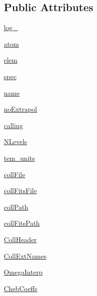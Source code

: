 \subsection*{Public Attributes}
\begin{DoxyCompactItemize}
\item 
\hyperlink{classpyneb_1_1core_1_1pynebcore_1_1___coll_data_fits_afd87151907f32bc0dc45f0171b61374e}{log\-\_\-}
\item 
\hyperlink{classpyneb_1_1core_1_1pynebcore_1_1___coll_data_fits_a0c5c7091b1d8a95d9bee2744d713f5c9}{atom}
\item 
\hyperlink{classpyneb_1_1core_1_1pynebcore_1_1___coll_data_fits_a62e73dc66c7aff7941c5ce94e808c23a}{elem}
\item 
\hyperlink{classpyneb_1_1core_1_1pynebcore_1_1___coll_data_fits_adaf1b66faf18504ec4b5c8c0b7f6763b}{spec}
\item 
\hyperlink{classpyneb_1_1core_1_1pynebcore_1_1___coll_data_fits_ab74e6bf80237ddc4109968cedc58c151}{name}
\item 
\hyperlink{classpyneb_1_1core_1_1pynebcore_1_1___coll_data_fits_a52e264b8c50ff2cf7d96c19e3f1e2a95}{no\-Extrapol}
\item 
\hyperlink{classpyneb_1_1core_1_1pynebcore_1_1___coll_data_fits_ab25fa7ebe84b603684dee62410c1e34c}{calling}
\item 
\hyperlink{classpyneb_1_1core_1_1pynebcore_1_1___coll_data_fits_a4d45fe163c2108853ab418386bf4da56}{N\-Levels}
\item 
\hyperlink{classpyneb_1_1core_1_1pynebcore_1_1___coll_data_fits_a538e48ab1f2ca63dbe55abea69ca2242}{tem\-\_\-units}
\item 
\hyperlink{classpyneb_1_1core_1_1pynebcore_1_1___coll_data_fits_ab1799c18dddda68ec8651caf93c90e40}{coll\-File}
\item 
\hyperlink{classpyneb_1_1core_1_1pynebcore_1_1___coll_data_fits_a1570b17843b0152b836049295bedb8ec}{coll\-Fits\-File}
\item 
\hyperlink{classpyneb_1_1core_1_1pynebcore_1_1___coll_data_fits_adde256ff299a719e21c78ff9aad1b68c}{coll\-Path}
\item 
\hyperlink{classpyneb_1_1core_1_1pynebcore_1_1___coll_data_fits_aba92b77e6304fd2d31a920d7cd3a196d}{coll\-Fits\-Path}
\item 
\hyperlink{classpyneb_1_1core_1_1pynebcore_1_1___coll_data_fits_a38a28019b2004f62d5966a3883e08c3a}{Coll\-Header}
\item 
\hyperlink{classpyneb_1_1core_1_1pynebcore_1_1___coll_data_fits_a732b7a4bded0827cb1e366ef900d7e29}{Coll\-Ext\-Names}
\item 
\hyperlink{classpyneb_1_1core_1_1pynebcore_1_1___coll_data_fits_a9fb4568356c398593832b0d4f2eb18d9}{Omega\-Interp}
\item 
\hyperlink{classpyneb_1_1core_1_1pynebcore_1_1___coll_data_fits_a17c4aa531ece492d2e5413133fb75d94}{Cheb\-Coeffs}
\end{DoxyCompactItemize}


